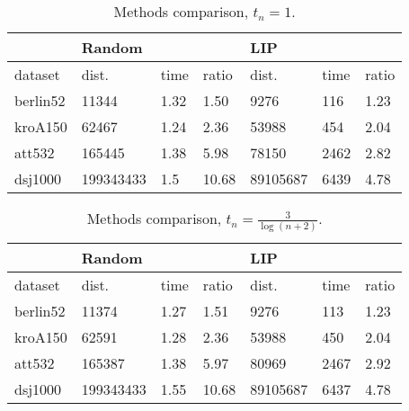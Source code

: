 \begin{table}[!htb]
	\centering
	\begin{tabular}{l|lll|lll|}
		\cline{2-7}
		& \multicolumn{3}{l|}{Random}                                        & \multicolumn{3}{l|}{LIP}                                          \\ \hline
		\multicolumn{1}{|l|}{dataset}  & \multicolumn{1}{l|}{dist.}     & \multicolumn{1}{l|}{time} & ratio & \multicolumn{1}{l|}{dist.}    & \multicolumn{1}{l|}{time} & ratio \\ \hline
		\multicolumn{1}{|l|}{berlin52} & \multicolumn{1}{l|}{11344}     & \multicolumn{1}{l|}{1.32} & 1.50  & \multicolumn{1}{l|}{9276}     & \multicolumn{1}{l|}{116}  & 1.23  \\ \hline
		\multicolumn{1}{|l|}{kroA150}  & \multicolumn{1}{l|}{62467}     & \multicolumn{1}{l|}{1.24} & 2.36  & \multicolumn{1}{l|}{53988}    & \multicolumn{1}{l|}{454}  & 2.04  \\ \hline
		\multicolumn{1}{|l|}{att532}   & \multicolumn{1}{l|}{165445}    & \multicolumn{1}{l|}{1.38} & 5.98  & \multicolumn{1}{l|}{78150}    & \multicolumn{1}{l|}{2462} & 2.82  \\ \hline
		\multicolumn{1}{|l|}{dsj1000}  & \multicolumn{1}{l|}{199343433} & \multicolumn{1}{l|}{1.5}  & 10.68 & \multicolumn{1}{l|}{89105687} & \multicolumn{1}{l|}{6439} & 4.78  \\ \hline
	\end{tabular}
	\caption{Methods comparison, $t_n=1$.}
	\label{tab:results_comp_cool=1}
\end{table}

\begin{table}[!htb]
	\centering
	\begin{tabular}{l|lll|lll|}
		\cline{2-7}
		& \multicolumn{3}{l|}{Random}                                        & \multicolumn{3}{l|}{LIP}                                          \\ \hline
		\multicolumn{1}{|l|}{dataset}  & \multicolumn{1}{l|}{dist.}     & \multicolumn{1}{l|}{time} & ratio & \multicolumn{1}{l|}{dist.}    & \multicolumn{1}{l|}{time} & ratio \\ \hline
		\multicolumn{1}{|l|}{berlin52} & \multicolumn{1}{l|}{11374}     & \multicolumn{1}{l|}{1.27} & 1.51  & \multicolumn{1}{l|}{9276}     & \multicolumn{1}{l|}{113}  & 1.23  \\ \hline
		\multicolumn{1}{|l|}{kroA150}  & \multicolumn{1}{l|}{62591}     & \multicolumn{1}{l|}{1.28} & 2.36  & \multicolumn{1}{l|}{53988}    & \multicolumn{1}{l|}{450}  & 2.04  \\ \hline
		\multicolumn{1}{|l|}{att532}   & \multicolumn{1}{l|}{165387}    & \multicolumn{1}{l|}{1.38} & 5.97  & \multicolumn{1}{l|}{80969}    & \multicolumn{1}{l|}{2467} & 2.92  \\ \hline
		\multicolumn{1}{|l|}{dsj1000}  & \multicolumn{1}{l|}{199343433} & \multicolumn{1}{l|}{1.55} & 10.68 & \multicolumn{1}{l|}{89105687} & \multicolumn{1}{l|}{6437} & 4.78  \\ \hline
	\end{tabular}
	\caption{Methods comparison, $t_n=\frac{3}{\log(n+2)}$.}
	\label{tab:results_comp_cool=2.73}
\end{table}